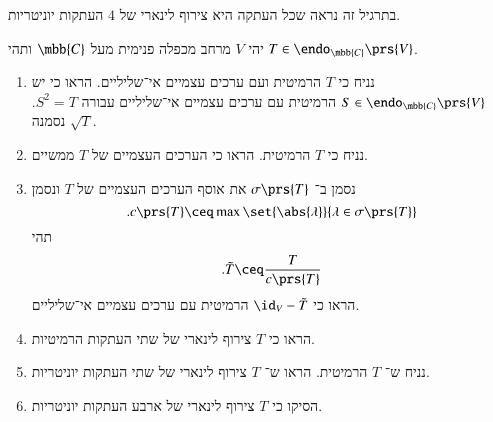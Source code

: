 \documentclass[a4paper,10pt,oneside,openany]{article}
\begin{document}
\begin{exercise}
בתרגיל זה נראה שכל העתקה היא צירוף לינארי של
$4$
העתקות יוניטריות.

יהי
$V$
מרחב מכפלה פנימית מעל
$\mbb{C}$
ותהי
$T \in \endo_{\mbb{C}}\prs{V}$.
\begin{enumerate}
\item נניח כי
$T$
הרמיטית ועם ערכים עצמיים אי־שליליים.
הראו כי יש
$S \in \endo_{\mbb{C}}\prs{V}$
הרמיטית עם ערכים עצמיים אי־שליליים עבורה
$S^2 = T$.
נסמנה
$\sqrt{T}$.

\item
נניח כי
$T$
הרמיטית. הראו כי הערכים העצמיים של
$T$
ממשיים.

\item נסמן ב־%
$\sigma\prs{T}$
את אוסף הערכים העצמיים של
$T$
ונסמן
\[\text{.} c \prs{T} \ceq \max\set{\abs{\lambda}}{\lambda \in \sigma\prs{T}}\]
תהי
\[\text{.} \tilde{T} \ceq \frac{T}{c\prs{T}}\]
הראו כי
$\id_V - \tilde{T}$
הרמיטית עם ערכים עצמיים אי־שליליים.

\item הראו כי
$T$
צירוף לינארי של שתי העתקות הרמיטיות.

\item 
נניח ש־%
$T$
הרמיטית.
הראו ש־%
$T$
צירוף לינארי של שתי העתקות יוניטריות.

\item
הסיקו כי
$T$
צירוף לינארי של ארבע העתקות יוניטריות.
\end{enumerate}
\end{exercise}
\end{document}
